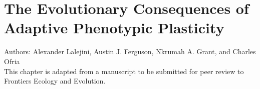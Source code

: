\chapter{The Evolutionary Consequences of Adaptive Phenotypic Plasticity}
\label{chapter:evolutionary-consequences-of-plasticity}



\noindent
Authors: Alexander Lalejini, Austin J. Ferguson, Nkrumah A. Grant, and Charles Ofria \\
This chapter is adapted from a manuscript to be submitted for peer review to Frontiers Ecology and Evolution. 




